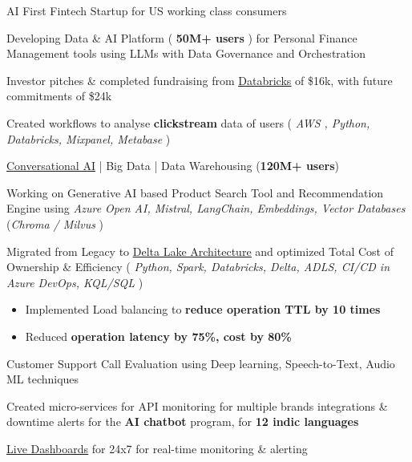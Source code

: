 \documentclass[]{deedy-resume-reversed}
\begin{document}
\vspace{\topsep} %

\begin{tightemize}
\item AI First Fintech Startup for US working class consumers
\item Developing Data \& AI Platform ( \textbf{50M+ users} ) for Personal Finance Management tools using LLMs with Data Governance and Orchestration
\item Investor pitches \& completed fundraising from \underline{\href{https://www.databricks.com/product/startups}{Databricks}} of \$16k, with future commitments of \$24k
\item Created workflows to analyse \textbf{clickstream} data of users (\textit{ AWS , Python,  Databricks, Mixpanel, Metabase })
\end{tightemize}
\sectionsep

\vspace{\topsep} %

\begin{tightemize}
\item \href{https://drive.google.com/file/d/1pztxC-TmhhKaqk0sQUJ8XaVXDKmad92V/view?usp=sharing}{\underline{Conversational AI}} | Big Data | Data Warehousing (\textbf{120M+ users})
\item Working on Generative AI based Product Search Tool and Recommendation Engine using \textit{Azure Open AI, Mistral, LangChain, Embeddings, Vector Databases} (\textit{Chroma / Milvus} )
\item Migrated from Legacy to \href{https://drive.google.com/file/d/1FH0p2Gy_5d0h4D7Czsslx3dkdUqMD-IP/view?usp=sharing}{\underline{Delta Lake Architecture}} and optimized Total Cost of Ownership \& Efficiency (\textit{ Python, Spark, Databricks, Delta, ADLS, CI/CD in Azure DevOps, KQL/SQL })
\begin{itemize}
        \item Implemented Load balancing to\textbf{ reduce operation TTL by 10 times}
        \item Reduced \textbf{operation latency by 75\%, cost by 80\%}
\end{itemize}

\item Customer Support Call Evaluation using Deep learning, Speech-to-Text, Audio ML techniques
\item Created micro-services for API monitoring for multiple brands integrations \& downtime alerts for the \textbf{AI chatbot} program, for \textbf{12 indic languages}
\item \href{https://drive.google.com/file/d/1ON88613DfbFg78HwDsAdzry1J6u3jsra/view?usp=drive_link}{\underline{Live Dashboards}} for 24x7 for real-time monitoring \& alerting
\end{tightemize}
\sectionsep
\end{document}
